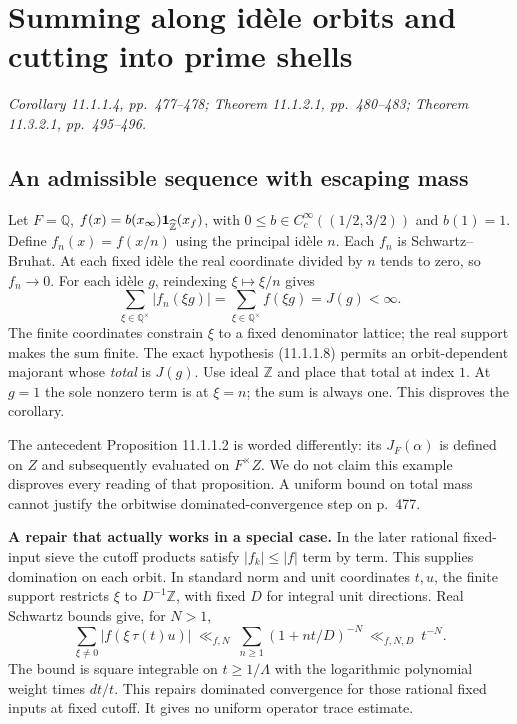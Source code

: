 \documentclass[11pt,reqno]{amsart}
\numberwithin{equation}{section}
\newcommand{\Q}{\mathbb Q}\newcommand{\R}{\mathbb R}\newcommand{\C}{\mathbb C}\newcommand{\Z}{\mathbb Z}
\begin{document}
\section{Summing along idèle orbits and cutting into prime shells}\label{sec:8}

\textit{Corollary 11.1.1.4, pp.~477--478; Theorem 11.1.2.1, pp.~480--483; Theorem 11.3.2.1, pp.~495--496.}\par
\subsection*{An admissible sequence with escaping mass}
Let \(F=\Q\), \(f(x)=b(x_\infty)\id_{\widehat{\Z}}(x_f)\), with \(0\le b\in C_c^\infty((1/2,3/2))\) and \(b(1)=1\). Define \(f_n(x)=f(x/n)\) using the principal idèle \(n\). Each \(f_n\) is Schwartz--Bruhat. At each fixed idèle the real coordinate divided by \(n\) tends to zero, so \(f_n\to0\). For each idèle \(g\), reindexing \(\xi\mapsto\xi/n\) gives
\[
     \sum_{\xi\in\Q^\times}|f_n(\xi g)|=\sum_{\xi\in\Q^\times}f(\xi g)=J(g)<\infty .
\]
The finite coordinates constrain \(\xi\) to a fixed denominator lattice; the real support makes the sum finite. The exact hypothesis (11.1.1.8) permits an orbit-dependent majorant whose \emph{total} is \(J(g)\). Use ideal \(\Z\) and place that total at index \(1\). At \(g=1\) the sole nonzero term is at \(\xi=n\); the sum is always one. This disproves the corollary.

The antecedent Proposition 11.1.1.2 is worded differently: its \(J_F(\alpha)\) is defined on \(Z\) and subsequently evaluated on \(F^\times Z\). We do not claim this example disproves every reading of that proposition. A uniform bound on total mass cannot justify the orbitwise dominated-convergence step on p.~477.

\textbf{A repair that actually works in a special case.} In the later rational fixed-input sieve the cutoff products satisfy \(|f_k|\le |f|\) term by term. This supplies domination on each orbit. In standard norm and unit coordinates \(t,u\), the finite support restricts \(\xi\) to \(D^{-1}\Z\), with fixed \(D\) for integral unit directions. Real Schwartz bounds give, for \(N>1\),
\[
   \sum_{\xi\ne0}|f(\xi\,\tau(t)u)|\ \ll_{f,N}\ \sum_{n\ge1}(1+nt/D)^{-N}\ \ll_{f,N,D}\ t^{-N}.
\]
The bound is square integrable on \(t\ge1/\Lambda\) with the logarithmic polynomial weight times \(dt/t\). This repairs dominated convergence for those rational fixed inputs at fixed cutoff. It gives no uniform operator trace estimate.
\end{document}
